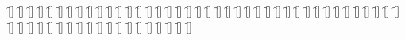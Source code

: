 \begin{questions}
\begin{multicols}{2}
        \question  \f[]
        \question  \f[]
        \question  \f[]
        \question  \f[]
        \question  \f[]
        \question  \f[]
        \question  \f[]
        \question  \f[]
        \question  \f[]
        \question  \f[]
        \question  \f[]
        \question  \f[]
        \question  \f[]
        \question  \f[]
        \question  \f[]
        \question  \f[]
        \question  \f[]
        \question  \f[]
        \question  \f[]
        \question  \f[]
        \question  \f[]
        \question  \f[]
        \question  \f[]
        \question  \f[]
        \question  \f[]
        \question  \f[]
        \question  \f[]
        \question  \f[]
        \question  \f[]
        \question  \f[]
        \question  \f[]
        \question  \f[]
        \question  \f[]
        \question  \f[]
        \question  \f[]
        \question  \f[]
        \question  \f[]
        \question  \f[]
        \question  \f[]
        \question  \f[]
        \question  \f[]
        \question  \f[]
        \question  \f[]
        \question  \f[]
        \question  \f[]
        \question  \f[]
        \question  \f[]
        \question  \f[]
        \question  \f[]
        \question  \f[]
        \question  \f[]
        \question  \f[]
        \question  \f[]
        \question  \f[]
        \question  \f[]
        \question  \f[]
        \question  \f[]
        \question  \f[]
        \question  \f[]
    \end{multicols}
\end{questions}
